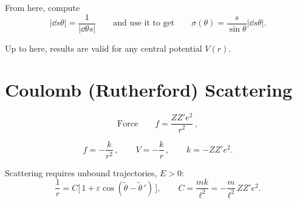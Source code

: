 \documentclass[11pt]{article}
\begin{document}
From here, compute
\begin{equation}
\left\lvert \dd{s}{\theta}\right\rvert = \frac{1}{\left\lvert \dd{\theta}{s}\right\rvert}
\qquad\text{and use it to get}\qquad
\sigma(\theta) = \frac{s}{\sin\theta}\left\lvert \dd{s}{\theta}\right\rvert.
\end{equation}

\begin{aside}
Up to here, results are valid for any central potential $V(r)$.
\end{aside}

\section{Coulomb (Rutherford) Scattering}

\begin{equation}
\text{Force}\qquad
f = \frac{Z Z' e^{2}}{r^{2}}\,,
\end{equation}
\begin{center}
\end{center}
\begin{equation}
f = -\frac{k}{r^{2}}\,,\qquad V = -\frac{k}{r}\,,\qquad k = -Z Z' e^{2}.
\end{equation}

\begin{center}
\end{center}

Scattering requires unbound trajectories, $E>0$:
\begin{equation}
\frac{1}{r} = C\bigl[\,1 + \varepsilon\cos(\tilde\theta - \tilde\theta\,')\,\bigr],
\qquad
C = \frac{mk}{\ell^{2}} = -\frac{m}{\ell^{2}}\,Z Z' e^{2}.
\label{eq:coulomb-orbit}
\end{equation}
\end{document}
